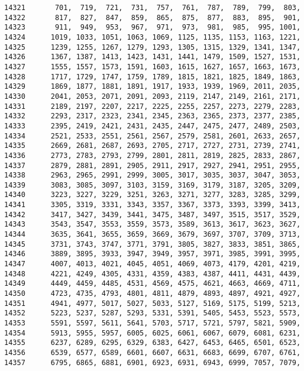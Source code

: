 \begin{Code}
\begin{verbatim}
14321       701,  719,  721,  731,  757,  761,  787,  789,  799,  803,
14322       817,  827,  847,  859,  865,  875,  877,  883,  895,  901,
14323       911,  949,  953,  967,  971,  973,  981,  985,  995, 1001,
14324      1019, 1033, 1051, 1063, 1069, 1125, 1135, 1153, 1163, 1221,
14325      1239, 1255, 1267, 1279, 1293, 1305, 1315, 1329, 1341, 1347,
14326      1367, 1387, 1413, 1423, 1431, 1441, 1479, 1509, 1527, 1531,
14327      1555, 1557, 1573, 1591, 1603, 1615, 1627, 1657, 1663, 1673, 
14328      1717, 1729, 1747, 1759, 1789, 1815, 1821, 1825, 1849, 1863,
14329      1869, 1877, 1881, 1891, 1917, 1933, 1939, 1969, 2011, 2035,
14330      2041, 2053, 2071, 2091, 2093, 2119, 2147, 2149, 2161, 2171,
14331      2189, 2197, 2207, 2217, 2225, 2255, 2257, 2273, 2279, 2283,
14332      2293, 2317, 2323, 2341, 2345, 2363, 2365, 2373, 2377, 2385,
14333      2395, 2419, 2421, 2431, 2435, 2447, 2475, 2477, 2489, 2503, 
14334      2521, 2533, 2551, 2561, 2567, 2579, 2581, 2601, 2633, 2657,
14335      2669, 2681, 2687, 2693, 2705, 2717, 2727, 2731, 2739, 2741,
14336      2773, 2783, 2793, 2799, 2801, 2811, 2819, 2825, 2833, 2867,
14337      2879, 2881, 2891, 2905, 2911, 2917, 2927, 2941, 2951, 2955,
14338      2963, 2965, 2991, 2999, 3005, 3017, 3035, 3037, 3047, 3053,
14339      3083, 3085, 3097, 3103, 3159, 3169, 3179, 3187, 3205, 3209,
14340      3223, 3227, 3229, 3251, 3263, 3271, 3277, 3283, 3285, 3299,
14341      3305, 3319, 3331, 3343, 3357, 3367, 3373, 3393, 3399, 3413,
14342      3417, 3427, 3439, 3441, 3475, 3487, 3497, 3515, 3517, 3529,
14343      3543, 3547, 3553, 3559, 3573, 3589, 3613, 3617, 3623, 3627,
14344      3635, 3641, 3655, 3659, 3669, 3679, 3697, 3707, 3709, 3713,
14345      3731, 3743, 3747, 3771, 3791, 3805, 3827, 3833, 3851, 3865,
14346      3889, 3895, 3933, 3947, 3949, 3957, 3971, 3985, 3991, 3995,
14347      4007, 4013, 4021, 4045, 4051, 4069, 4073, 4179, 4201, 4219,
14348      4221, 4249, 4305, 4331, 4359, 4383, 4387, 4411, 4431, 4439,
14349      4449, 4459, 4485, 4531, 4569, 4575, 4621, 4663, 4669, 4711,
14350      4723, 4735, 4793, 4801, 4811, 4879, 4893, 4897, 4921, 4927,
14351      4941, 4977, 5017, 5027, 5033, 5127, 5169, 5175, 5199, 5213,
14352      5223, 5237, 5287, 5293, 5331, 5391, 5405, 5453, 5523, 5573,
14353      5591, 5597, 5611, 5641, 5703, 5717, 5721, 5797, 5821, 5909,
14354      5913, 5955, 5957, 6005, 6025, 6061, 6067, 6079, 6081, 6231,
14355      6237, 6289, 6295, 6329, 6383, 6427, 6453, 6465, 6501, 6523,
14356      6539, 6577, 6589, 6601, 6607, 6631, 6683, 6699, 6707, 6761,
14357      6795, 6865, 6881, 6901, 6923, 6931, 6943, 6999, 7057, 7079,

\end{verbatim}
\end{Code}

